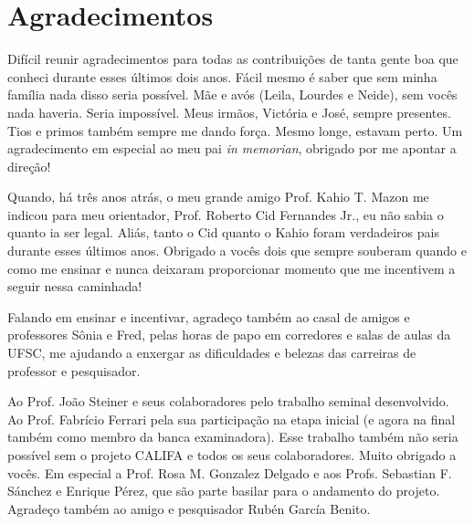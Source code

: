 

\chapter*{Agradecimentos}

Difícil reunir agradecimentos para todas as contribuições de tanta gente boa que conheci durante esses últimos dois
anos. Fácil mesmo é saber que sem minha família nada disso seria possível. Mãe e avós (Leila, Lourdes e Neide), sem
vocês nada haveria. Seria impossível. Meus irmãos, Victória e José, sempre presentes. Tios e primos também sempre me
dando força. Mesmo longe, estavam perto. Um agradecimento em especial ao meu pai {\em in memorian}, obrigado por me
apontar a direção!

Quando, há três anos atrás, o meu grande amigo Prof. Kahio T. Mazon me indicou para meu orientador, Prof. Roberto Cid
Fernandes Jr., eu não sabia o quanto ia ser legal. Aliás, tanto o Cid quanto o Kahio foram verdadeiros pais durante
esses últimos anos. Obrigado a vocês dois que sempre souberam quando e como me ensinar e nunca deixaram proporcionar
momento que me incentivem a seguir nessa caminhada!

Falando em ensinar e incentivar, agradeço também ao casal de amigos e professores Sônia e Fred, pelas horas de papo em
corredores e salas de aulas da UFSC, me ajudando a enxergar as dificuldades e belezas das carreiras de professor e
pesquisador.

Ao Prof. João Steiner e seus colaboradores pelo trabalho seminal desenvolvido. Ao Prof. Fabrício Ferrari pela sua
participação na etapa inicial (e agora na final também como membro da banca examinadora). Esse trabalho também não seria
possível sem o projeto CALIFA e todos os seus colaboradores. Muito obrigado a vocês. Em especial a Prof. Rosa M.
Gonzalez Delgado e aos Profs. Sebastian F. Sánchez e Enrique Pérez, que são parte basilar para o andamento do projeto.
Agradeço também ao amigo e pesquisador Rubén García Benito.

